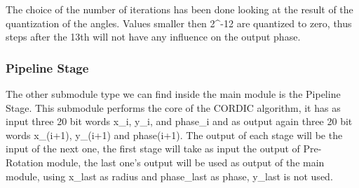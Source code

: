 The choice of the number of iterations has been done looking at the result of
the quantization of the angles. Values smaller then 2^-12 are quantized to zero,
thus steps after the 13th  will not have any influence on the output phase.

\subsubsection{Pipeline Stage}
The other submodule type we can find inside the main module is the Pipeline
Stage. This submodule performs the core of the CORDIC algorithm, it has
as input three 20 bit words x_i, y_i, and phase_i and as output again three 20
bit words x_(i+1), y_(i+1) and phase(i+1). The output of each stage will be the
input of the next one, the first stage will take as input the output of
Pre-Rotation module, the last one's output will be used as output of the main
module, using x_last as radius and phase_last as phase, y_last is not used. 






